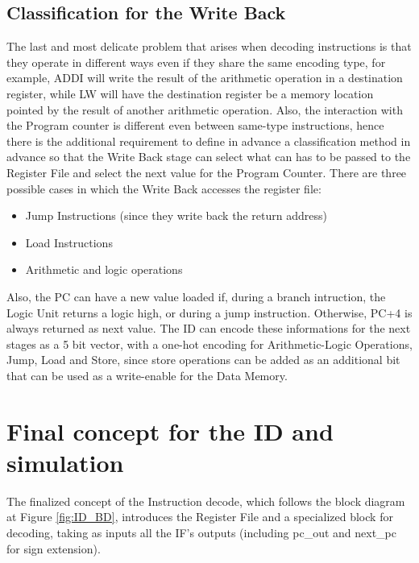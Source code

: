 \subsection{Classification for the Write Back}
The last and most delicate problem that arises when decoding instructions is that they operate in different ways even if they share the same encoding type, for example, ADDI will write the result of the arithmetic operation in a destination register, while LW will have the destination register be a memory location pointed by the result of another arithmetic operation. Also, the interaction with the Program counter is different even between same-type instructions, hence there is the additional requirement to define in advance a classification method in advance so that the Write Back stage can select what can has to be passed to the Register File and select the next value for the Program Counter.
There are three possible cases in which the Write Back accesses the register file:
\begin{itemize}
  \item Jump Instructions (since they write back the return address)
  \item Load Instructions
  \item Arithmetic and logic operations
\end{itemize}
Also, the PC can have a new value loaded if, during a branch intruction, the Logic Unit returns a logic high, or during a jump instruction. Otherwise, PC+4 is always returned as next value.
The ID can encode these informations for the next stages as a 5 bit vector, with a one-hot encoding for Arithmetic-Logic Operations, Jump, Load and Store, since store operations can be added as an additional bit that can be used as a write-enable for the Data Memory.

\section{Final concept for the ID and simulation}
The finalized concept of the Instruction decode, which follows the block diagram at Figure \ref{fig:ID_BD}, introduces the Register File and a specialized block for decoding, taking as inputs all the IF's outputs (including {pc\_out} and {next\_pc} for sign extension).

